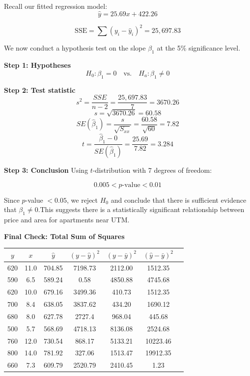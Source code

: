 \begin{example}
Recall our fitted regression model:
\[
\hat{y} = 25.69x + 422.26
\]

\[
\text{SSE} = \sum (y_i - \hat{y}_i)^2 = 25,\!697.83
\]

We now conduct a hypothesis test on the slope $\beta_1$ at the 5\% significance level.

\textbf{Step 1: Hypotheses}
\[
H_0: \beta_1 = 0 \quad \text{vs.} \quad H_a: \beta_1 \ne 0
\]

\textbf{Step 2: Test statistic}
\[
s^2 = \frac{SSE}{n - 2} = \frac{25,\!697.83}{7} = 3670.26
\]
\[
s = \sqrt{3670.26} = 60.58
\]
\[
SE(\hat{\beta}_1) = \frac{s}{\sqrt{S_{xx}}} = \frac{60.58}{\sqrt{60}} = 7.82
\]
\[
t = \frac{\hat{\beta}_1 - 0}{SE(\hat{\beta}_1)} = \frac{25.69}{7.82} = 3.284
\]

\textbf{Step 3: Conclusion}
Using $t$-distribution with 7 degrees of freedom:

\[
0.005 < p\text{-value} < 0.01
\]

Since $p$-value $< 0.05$, we reject $H_0$ and conclude that there is sufficient evidence that $\beta_1 \ne 0$.This suggests there is a statistically significant relationship between price and area for apartments near UTM.

\textbf{Final Check: Total Sum of Squares}

\begin{center}
\renewcommand{\arraystretch}{1.2}
\begin{tabular}{ccccccc}
\toprule
$y$ & $x$ & $\hat{y}$ & $(y - \hat{y})^2$ & $(y - \bar{y})^2$ & $(\hat{y} - \bar{y})^2$ \\
\midrule
620 & 11.0 & 704.85 & 7198.73 & 2112.00 & 1512.35 \\
590 & 6.5 & 589.24 & 0.58 & 4850.88 & 4745.68 \\
620 & 10.0 & 679.16 & 3499.36 & 410.73 & 1512.35 \\
700 & 8.4 & 638.05 & 3837.62 & 434.20 & 1690.12 \\
680 & 8.0 & 627.78 & 2727.4 & 968.04 & 445.68 \\
500 & 5.7 & 568.69 & 4718.13 & 8136.08 & 2524.68 \\
760 & 12.0 & 730.54 & 868.17 & 5133.21 & 10223.46 \\
800 & 14.0 & 781.92 & 327.06 & 1513.47 & 19912.35 \\
660 & 7.3 & 609.79 & 2520.79 & 2410.45 & 1.23 \\
\bottomrule
\end{tabular}
\end{center}


\end{example}

